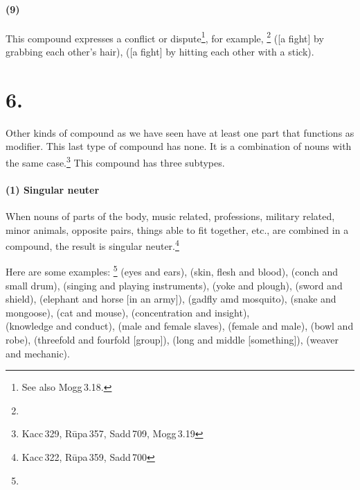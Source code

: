 \paragraph*{(9) } This compound expresses a conflict or dispute\footnote{See also Mogg\,3.18.}, for example, \footnote{} ([a fight] by grabbing each other's hair),  ([a fight] by hitting each other with a stick).

\section*{6. }\label{sec:dvan}

Other kinds of compound as we have seen have at least one part that functions as modifier. This last type of compound has none. It is a combination of nouns with the same case.\footnote{Kacc\,329, R\=upa\,357, Sadd\,709, Mogg\,3.19} This compound has three subtypes.

\paragraph*{(1) Singular neuter} When nouns of parts of the body, music related, professions, military related, minor animals, opposite pairs, things able to fit together, etc., are combined in a compound, the result is singular neuter.\footnote{Kacc\,322, R\=upa\,359, Sadd\,700} 

Here are some examples: \footnote{} (eyes and ears),  (skin, flesh and blood),  (conch and small drum),  (singing and playing instruments),  (yoke and plough),  (sword and shield),  (elephant and horse [in an army]),  (gadfly amd mosquito),  (snake and mongoose),  (cat and mouse),  (concentration and insight),  \\(knowledge and conduct),  (male and female slaves),  (female and male),  (bowl and robe),  (threefold and fourfold [group]),  (long and middle [something]),  (weaver and mechanic).

